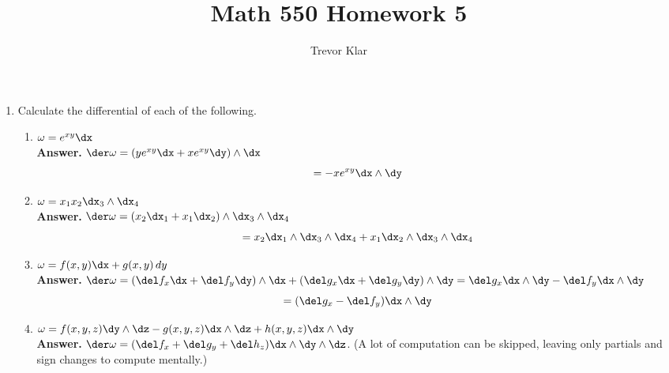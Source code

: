 \documentclass[letterpaper]{article}
\title{Math 550 \linebreak
Homework 5}
\author{Trevor Klar}
\begin{document}
\maketitle

\begin{enumerate}
	\item Calculate the differential of each of the following.
	\begin{enumerate}
		\item $\omega=e^{xy}\dx$\\
			\textbf{Answer.} $\der\omega=(ye^{xy}\dx+xe^{xy}\dy)\wedge\dx$ $$ = -xe^{xy}\dx\wedge\dy$$
		\item $\omega=x_1x_2\dx_3\wedge\dx_4$\\
			\textbf{Answer.} $\der\omega=(x_2\dx_1+x_1\dx_2)\wedge\dx_3\wedge\dx_4$ $$=x_2\dx_1\wedge\dx_3\wedge\dx_4+x_1\dx_2\wedge\dx_3\wedge\dx_4 $$
		\item $\omega=f(x,y)\dx+g(x,y)\, dy$\\
			\textbf{Answer.} $\der\omega=(\del f_x\dx+\del f_y\dy)\wedge\dx+(\del g_x\dx+\del g_y\dy)\wedge\dy=\del g_x\dx\wedge\dy-\del f_y\dx\wedge\dy$ $$= (\del g_x-\del f_y)\dx\wedge\dy$$
		\item $\omega=f(x,y,z)\dy\wedge\dz-g(x,y,z)\dx\wedge\dz+h(x,y,z)\dx\wedge\dy$\\
			\textbf{Answer.} $\der\omega=(\del f_x+\del g_y+\del h_z)\dx\wedge\dy\wedge\dz$. (A lot of computation can be skipped, leaving only partials and sign changes to compute mentally.)
	\end{enumerate}
\end{enumerate}
\end{document}
